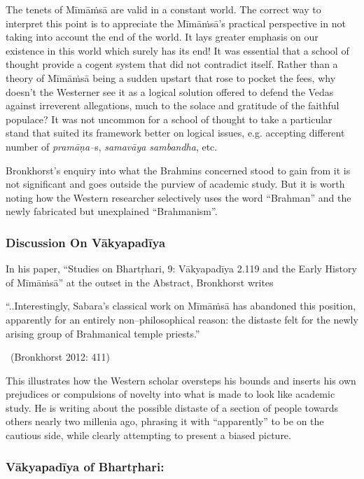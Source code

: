 The tenets of Mīmāṁsā are valid in a constant world. The correct way to interpret this point is to appreciate the Mīmāṁsā’s practical perspective in not taking into account the end of the world. It lays greater emphasis on our existence in this world which surely has its end! It was essential that a school of thought provide a cogent system that did not contradict itself. Rather than a theory of Mīmāṁsā being a sudden upstart that rose to pocket the fees, why doesn’t the Westerner see it as a logical solution offered to defend the Vedas against irreverent allegations, much to the solace and gratitude of the faithful populace? It was not uncommon for a school of thought to take a particular stand that suited its framework better on logical issues, e.g. accepting different number of \textit{pramāṇa–}s, \textit{samavāya sambandha}, etc.

Bronkhorst’s enquiry into what the Brahmins concerned stood to gain from it is not significant and goes outside the purview of academic study. But it is worth noting how the Western researcher selectively uses the word “Brahman” and the newly fabricated but unexplained “Brahmanism”.

\subsubsection*{Discussion On Vākyapadīya}

In his paper, “Studies on Bhartṛhari, 9: Vākyapadīya 2.119 and the Early History of Mīmāṁsā” at the outset in the Abstract, Bronkhorst writes

\begin{myquote}
“..Interestingly, Sabara’s classical work on Mīmāṁsā has abandoned this position, apparently for an entirely non–philosophical reason: the distaste felt for the newly arising group of Brahmanical temple priests.” 

~\hfill (Bronkhorst 2012: 411)
\end{myquote}

This illustrates how the Western scholar oversteps his bounds and inserts his own prejudices or compulsions of novelty into what is made to look like academic study. He is writing about the possible distaste of a section of people towards others nearly two millenia ago, phrasing it with “apparently” to be on the cautious side, while clearly attempting to present a biased picture.


\subsubsection*{Vākyapadīya of Bhartṛhari:}

